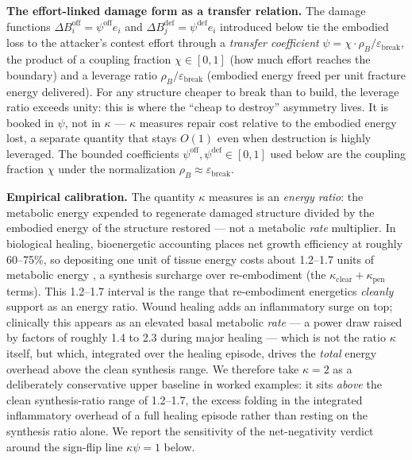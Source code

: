 \documentclass[11pt]{article}
\theoremstyle{plain}
\theoremstyle{definition}
\theoremstyle{remark}
\begin{document}
\textbf{The effort-linked damage form as a transfer relation.} The
damage functions \(\Delta B_i^{\text{off}} = \psi^{\text{off}} e_i\) and
\(\Delta B_j^{\text{def}} = \psi^{\text{def}} e_i\) introduced below tie
the embodied loss to the attacker's contest effort through a
\emph{transfer coefficient}
\(\psi = \chi \cdot \rho_B / \varepsilon_{\text{break}}\), the product
of a coupling fraction \(\chi \in [0,1]\) (how much effort reaches the
boundary) and a leverage ratio \(\rho_B / \varepsilon_{\text{break}}\)
(embodied energy freed per unit fracture energy delivered). For any
structure cheaper to break than to build, the leverage ratio exceeds
unity: this is where the ``cheap to destroy'' asymmetry lives. It is
booked in \(\psi\), not in \(\kappa\) --- \(\kappa\) measures repair
cost relative to the embodied energy lost, a separate quantity that
stays \(O(1)\) even when destruction is highly leveraged. The bounded
coefficients \(\psi^{\text{off}}, \psi^{\text{def}} \in [0,1]\) used
below are the coupling fraction \(\chi\) under the normalization
\(\rho_B \approx \varepsilon_{\text{break}}\).

\textbf{Empirical calibration.} The quantity \(\kappa\) measures is an
\emph{energy ratio}: the metabolic energy expended to regenerate damaged
structure divided by the embodied energy of the structure restored ---
not a metabolic \emph{rate} multiplier. In biological healing,
bioenergetic accounting places net growth efficiency at roughly
60--75\%, so depositing one unit of tissue energy costs about 1.2--1.7
units of metabolic energy \citep{Reeds1982EnergyCosts}, a synthesis
surcharge over re-embodiment (the
\(\kappa_{\text{clear}} + \kappa_{\text{pen}}\) terms). This 1.2--1.7
interval is the range that re-embodiment energetics \emph{cleanly}
support as an energy ratio. Wound healing adds an inflammatory surge on
top; clinically this appears as an elevated basal metabolic \emph{rate}
--- a power draw raised by factors of roughly 1.4 to 2.3 during major
healing \citep{Demling2009} --- which is not the ratio \(\kappa\)
itself, but which, integrated over the healing episode, drives the
\emph{total} energy overhead above the clean synthesis range. We
therefore take \(\kappa = 2\) as a deliberately conservative upper
baseline in worked examples: it sits \emph{above} the clean
synthesis-ratio range of 1.2--1.7, the excess folding in the integrated
inflammatory overhead of a full healing episode rather than resting on
the synthesis ratio alone. We report the sensitivity of the
net-negativity verdict around the sign-flip line \(\kappa\psi = 1\)
below.
\end{document}
